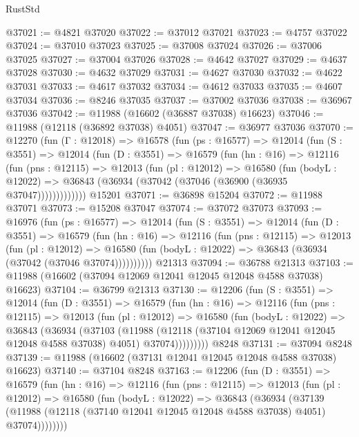 \begin{lexlean}{RustStd}
\begin{coremodule}
@37021 := @4821 @37020
@37022 := @37012 @37021
@37023 := @4757 @37022
@37024 := @37010 @37023
@37025 := @37008 @37024
@37026 := @37006 @37025
@37027 := @37004 @37026
@37028 := @4642 @37027
@37029 := @4637 @37028
@37030 := @4632 @37029
@37031 := @4627 @37030
@37032 := @4622 @37031
@37033 := @4617 @37032
@37034 := @4612 @37033
@37035 := @4607 @37034
@37036 := @8246 @37035
@37037 := @37002 @37036
@37038 := @36967 @37036
@37042 := @11988 (@16602 (@36887 @37038) @16623)
@37046 := @11988 (@12118 (@36892 @37038) @4051)
@37047 := @36977 @37036
@37070 := @12270
    (fun (Γ : @12018) =>
    @16578
      (fun (ps : @16577) =>
      @12014
        (fun (S : @3551) =>
        @12014
          (fun (D : @3551) =>
          @16579
            (fun (hn : @16) =>
            @12116
              (fun (pns : @12115) =>
              @12013
                (fun (pl : @12012) =>
                @16580
                  (fun (bodyL : @12022) =>
                  @36843 (@36934 (@37042 (@37046 (@36900 (@36935 @37047)))))))))))))
    @15201
@37071 := @36898 @15204
@37072 := @11988 @37071
@37073 := @15208 @37047
@37074 := @37072 @37073
@37093 := @16976
    (fun (ps : @16577) =>
    @12014
      (fun (S : @3551) =>
      @12014
        (fun (D : @3551) =>
        @16579
          (fun (hn : @16) =>
          @12116
            (fun (pns : @12115) =>
            @12013
              (fun (pl : @12012) =>
              @16580 (fun (bodyL : @12022) => @36843 (@36934 (@37042 (@37046 @37074))))))))))
    @21313
@37094 := @36788 @21313
@37103 := @11988 (@16602 (@37094 @12069 @12041 @12045 @12048 @4588 @37038) @16623)
@37104 := @36799 @21313
@37130 := @12206
    (fun (S : @3551) =>
    @12014
      (fun (D : @3551) =>
      @16579
        (fun (hn : @16) =>
        @12116
          (fun (pns : @12115) =>
          @12013
            (fun (pl : @12012) =>
            @16580
              (fun (bodyL : @12022) =>
              @36843
                (@36934
                  (@37103
                    (@11988
                      (@12118 (@37104 @12069 @12041 @12045 @12048 @4588 @37038) @4051)
                      @37074)))))))))
    @8248
@37131 := @37094 @8248
@37139 := @11988 (@16602 (@37131 @12041 @12045 @12048 @4588 @37038) @16623)
@37140 := @37104 @8248
@37163 := @12206
    (fun (D : @3551) =>
    @16579
      (fun (hn : @16) =>
      @12116
        (fun (pns : @12115) =>
        @12013
          (fun (pl : @12012) =>
          @16580
            (fun (bodyL : @12022) =>
            @36843
              (@36934
                (@37139
                  (@11988 (@12118 (@37140 @12041 @12045 @12048 @4588 @37038) @4051) @37074))))))))

\end{coremodule}
\end{lexlean}
